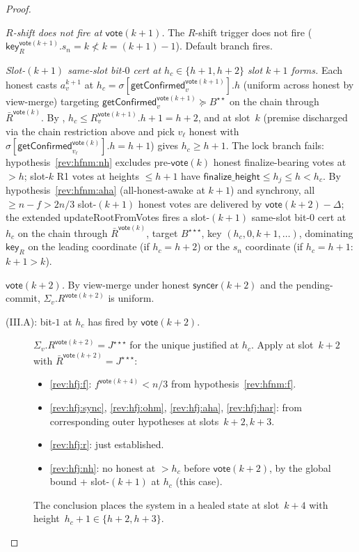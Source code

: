 \ifx\litemode\undefined\documentclass{article}\fi
\newcommand{\finalizeHeight}{\mathsf{finalize\_height}}
\newcommand{\key}{\mathsf{key}}
\newcommand{\syncer}{\mathsf{syncer}}
\newcommand{\vote}{\mathsf{vote}}
\newcommand{\comm}[1]{\bar{#1}}
\newcommand{\updateRootFromVotes}{\textsf{updateRootFromVotes}\xspace}
\newcommand{\getConfirmed}{\textsf{getConfirmed}\xspace}
\theoremstyle{plain}
\theoremstyle{definition}
\theoremstyle{remark}
\newcommand{\AHA}{all-honest-awake\xspace}
\begin{document}
\begin{proof}
\begin{description}
\emph{$R$-shift does not fire at $\vote(k+1)$.}
The $R$-shift trigger does not fire ($\key_R^{\vote(k+1)}.s_n = k \not< k = (k+1) - 1$). Default branch fires.

\emph{Slot-$(k+1)$ same-slot bit-$0$ cert at $h_c \in \{h+1, h+2\}$ slot $k+1$ forms.}
Each honest casts $a^{k+1}_v$ at $h_c = \sigma[\getConfirmed_v^{\vote(k+1)}].h$ (uniform across honest by view-merge) targeting $\getConfirmed_v^{\vote(k+1)} \succeq B^{\star\star}$ on the chain through $\comm{R}^{\vote(k)}$. By , $h_c \leq R_v^{\vote(k+1)}.h + 1 = h+2$, and  at slot~$k$ (premise discharged via the chain restriction above and pick $v_\ell$ honest with $\sigma[\getConfirmed_{v_\ell}^{\vote(k)}].h = h+1$) gives $h_c \geq h+1$. The lock branch fails: hypothesis~\ref{rev:hfnm:nh} excludes pre-$\vote(k)$ honest finalize-bearing votes at $> h$; slot-$k$ R1 votes at heights $\leq h+1$ have $\finalizeHeight \leq h_j \leq h < h_c$. By hypothesis~\ref{rev:hfnm:aha} (\AHA at $k+1$) and synchrony, all $\geq n - f > 2n/3$ slot-$(k+1)$ honest votes are delivered by $\vote(k+2) - \Delta$; the extended \updateRootFromVotes{} fires a slot-$(k+1)$ same-slot bit-$0$ cert at $h_c$ on the chain through $\comm{R}^{\vote(k)}$, target $B^{\star\star\star}$, key $(h_c, 0, k+1, \ldots)$, dominating $\key_R$ on the leading coordinate (if $h_c = h+2$) or the $s_n$ coordinate (if $h_c = h+1$: $k+1 > k$).

\emph{$\vote(k+2)$.}
By view-merge under honest $\syncer(k+2)$ and the pending-commit, $\Sigma_v.R^{\vote(k+2)}$ is uniform.

\begin{description}
\item[{(III.A): bit-$1$ at $h_c$ has fired by $\vote(k+2)$.}]\hfill

$\Sigma_v.R^{\vote(k+2)} = J^{\star\star\star}$ for the unique justified at $h_c$. Apply  at slot~$k+2$ with $\comm{R}^{\vote(k+2)} = J^{\star\star\star}$:
\begin{itemize}
  \item \ref{rev:hfj:f}: $f^{\vote(k+4)} < n/3$ from hypothesis~\ref{rev:hfnm:f}.
  \item \ref{rev:hfj:sync}, \ref{rev:hfj:ohm}, \ref{rev:hfj:aha}, \ref{rev:hfj:har}: from corresponding outer hypotheses at slots~$k+2, k+3$.
  \item \ref{rev:hfj:r}: just established.
  \item \ref{rev:hfj:nh}: no honest at $> h_c$ before $\vote(k+2)$, by the global bound + slot-$(k+1)$ at $h_c$ (this case).
\end{itemize}
The conclusion places the system in a healed state at slot~$k+4$ with height~$h_c + 1 \in \{h+2, h+3\}$.


\end{description}
\end{description}
\end{proof}
\end{document}
